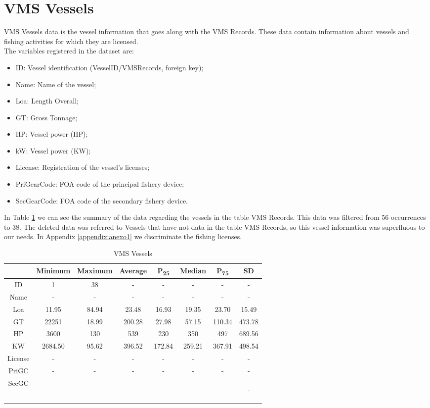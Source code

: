\section{VMS Vessels} %
\label{sub:vms_vessels}
VMS Vessels data is the vessel information that goes along with the VMS Records. These data contain information about vessels and fishing activities for which they are licensed. \\
The variables registered in the dataset are:
\begin{itemize}
\item ID: Vessel identification (VesselID/VMSRecords, foreign key);
\item Name: Name of the vessel;
\item Loa: Length Overall; 
\item GT: Gross Tonnage;
\item HP: Vessel power (HP);
\item kW: Vessel power (KW);
\item License: Registration of the vessel's licenses;
\item PriGearCode: FOA code of the principal fishery device;
\item SecGearCode: FOA code of the secondary fishery device.
\end{itemize}

In Table \ref{table:vms_vessels} we can see the summary of the data regarding the vessels in the table VMS Records. This data was filtered from 56 occurrences to 38. The deleted data was referred to Vessels that have not data in the table VMS Records, so this vessel information was superfluous to our needs. In Appendix \ref{appendix:anexo1} we discriminate the fishing licenses. 


\begin {table}[H]
\small
\begin{center}
\begin{tabular}{c|c|c|c|c|c|c|c}
& Minimum & Maximum & Average & P\textsubscript{25} & Median & P\textsubscript{75} & SD \\
\hline
ID & 1&38&-&-&-&-&-\\
Name &-&-&-&-&-&-&-\\
Loa & 11.95&84.94&23.48&16.93&19.35&23.70&15.49\\
GT &22251&18.99&200.28&27.98&57.15&110.34&473.78\\
HP & 3600&130&539&230&350&497&689.56\\
KW &2684.50&95.62&396.52&172.84&259.21&367.91&498.54\\
License &-&-&-&-&-&-&-\\
PriGC &-&-&-&-&-&-&-\\
SecGC &-&-&-&-&-&-&-


\label{table:vms_vessels}
\end{tabular}
\caption {VMS Vessels}
\end{center}
\end {table}

